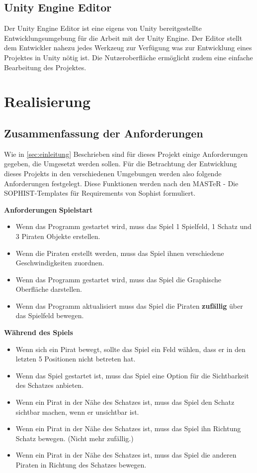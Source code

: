 \documentclass[
	12pt, %
	a4paper,
	listof=totoc, %
	bibliography=totoc, %
	numbers=noenddot, %
	ngerman, %
	headsepline, %
	oneside %
	]{scrbook} %
\begin{document}
\section{Unity Engine Editor}
Der Unity Engine Editor ist eine eigens von Unity bereitgestellte Entwicklungsumgebung für die Arbeit mit der Unity Engine. Der Editor stellt dem Entwickler nahezu jedes Werkzeug zur Verfügung was zur Entwicklung eines Projektes in Unity nötig ist. Die Nutzeroberfläche ermöglicht zudem eine einfache Bearbeitung des Projektes. 


\chapter{Realisierung}\label{sec:Realisierung}
\section{Zusammenfassung der Anforderungen}
Wie in \ref{sec:einleitung} Beschrieben sind für dieses Projekt einige Anforderungen gegeben, die Umgesetzt werden sollen. Für die Betrachtung der Entwicklung dieses Projekts in den verschiedenen Umgebungen werden also folgende Anforderungen festgelegt.
Diese Funktionen werden nach den \glqq MASTeR - Die SOPHIST-Templates für Requirements\grqq{} von Sophist formuliert\cite{sophist}.

\textbf{Anforderungen}
\textbf{Spielstart}
\begin{itemize}\vspace{-1em}
\setlength{\itemsep}{-1em}
	\item Wenn das Programm gestartet wird, muss das Spiel 1 Spielfeld, 1 Schatz und 3 Piraten Objekte erstellen.
	\item Wenn die Piraten erstellt werden, muss das Spiel ihnen verschiedene Geschwindigkeiten zuordnen.
	\item Wenn das Programm gestartet wird, muss das Spiel die Graphische Oberfläche darstellen.
	\item Wenn das Programm aktualisiert muss das Spiel die Piraten \textbf{zufällig} über das Spielfeld bewegen.
\end{itemize}

\textbf{Während des Spiels}
\begin{itemize}\vspace{-1em}
\setlength{\itemsep}{-1em}
	\item Wenn sich ein Pirat bewegt, sollte das Spiel ein Feld wählen, dass er in den letzten 5 Positionen nicht betreten hat.
	\item Wenn das Spiel gestartet ist, muss das Spiel eine Option für die Sichtbarkeit des Schatzes anbieten.
	\item Wenn ein Pirat in der Nähe des Schatzes ist, muss das Spiel den Schatz sichtbar machen, wenn er unsichtbar ist.
	\item Wenn ein Pirat in der Nähe des Schatzes ist, muss das Spiel ihn Richtung Schatz bewegen. (Nicht mehr zufällig.)
	\item Wenn ein Pirat in der Nähe des Schatzes ist, muss das Spiel die anderen Piraten in Richtung des Schatzes bewegen.
\end{itemize}
\end{document}
